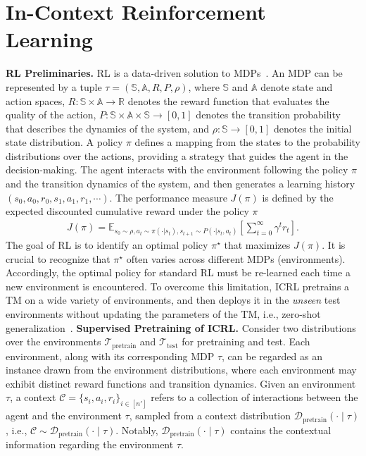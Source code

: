 \documentclass{article}
\def\Real{\mathbb{R}}
\def\mbA{{\ensuremath{\mathbb A}}}
\def\mbE{{\ensuremath{\mathbb E}}}
\def\mbS{{\ensuremath{\mathbb S}}}
\def\ccalC{{\ensuremath{\mathcal C}}}
\def\ccalD{{\ensuremath{\mathcal D}}}
\def\ccalT{{\ensuremath{\mathcal T}}}
\begin{document}
\section{In-Context Reinforcement Learning}
\label{section_preliminary}
\textbf{RL Preliminaries.}
RL is a data-driven solution to MDPs~\citep{sutton2018reinforcement}.
An MDP can be represented by a tuple $\tau = (\mbS, \mbA, R, P, \rho)$, where $\mbS$ and $\mbA$ denote state and action spaces, $R: \mbS \times \mbA \to \Real$ denotes the reward function that evaluates the quality of the action, $P: \mbS \times \mbA \times \mbS \to [0, 1]$ denotes the transition probability that describes the dynamics of the system, and $\rho: \mbS \to [0, 1]$ denotes the initial state distribution.
A policy $\pi$ defines a mapping from the states to the probability distributions over the actions, providing a strategy that guides the agent in the decision-making.
The agent interacts with the environment following the policy $\pi$ and the transition dynamics of the system, and then generates a learning history $(s_0, a_0, r_0, s_1, a_1, r_1, \cdots)$.
The performance measure $J (\pi)$ is defined by the expected discounted cumulative reward under the policy $\pi$
\begin{align}
    J (\pi) = \mbE_{s_0 \sim \rho, a_t \sim \pi(\cdot | s_t), s_{t+1} \sim P(\cdot|s_t, a_t)} \left[ \sum_{t=0}^\infty \gamma^t r_t \right].
\end{align}
The goal of RL is to identify an optimal policy $\pi^\star$ that maximizes $J (\pi)$.
It is crucial to recognize that $\pi^\star$ often varies across different MDPs (environments). Accordingly, the optimal policy for standard RL must be re-learned each time a new environment is encountered.
To overcome this limitation, ICRL pretrains a TM on a wide variety of environments, and then deploys it in the \textit{unseen} test environments without updating the parameters of the TM, i.e., zero-shot generalization~\citep{sohn2018hierarchical, mazoure2022improving, zisselman2023explore, kirk2023survey}.
\textbf{Supervised Pretraining of ICRL.}
Consider two distributions over the environments $\ccalT_{\text{pretrain}}$ and $\ccalT_{\text{test}}$ for pretraining and test. Each environment, along with its corresponding MDP $\tau$, can be regarded as an instance drawn from the environment distributions, where each environment may exhibit distinct reward functions and transition dynamics. Given an environment $\tau$, a context $\ccalC = \{s_i, a_i, r_i\}_{i \in [n']}$ refers to a collection of interactions between the agent and the environment $\tau$, sampled from a context distribution $\ccalD_{\text{pretrain}} (\cdot \mid \tau)$, i.e., $\ccalC \sim \ccalD_{\text{pretrain}} (\cdot \mid \tau)$. Notably, $\ccalD_{\text{pretrain}} (\cdot \mid \tau)$ contains the contextual information regarding the environment $\tau$.
\end{document}
